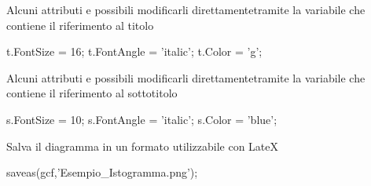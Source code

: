 \begin{par}
\begin{flushleft}
Alcuni attributi e possibili modificarli direttamentetramite la variabile che contiene il 
riferimento al titolo
\end{flushleft}
\end{par}

\begin{matlabcode}
t.FontSize = 16;
t.FontAngle = 'italic';
t.Color = 'g'; %
\end{matlabcode}

\begin{par}
\begin{flushleft}
Alcuni attributi e possibili modificarli direttamentetramite la variabile che contiene il 
riferimento al sottotitolo
\end{flushleft}
\end{par}

\begin{matlabcode}
s.FontSize = 10;
s.FontAngle = 'italic';
s.Color = 'blue'; %
\end{matlabcode}

\begin{par}
\begin{flushleft}
Salva il diagramma in un formato utilizzabile con LateX
\end{flushleft}
\end{par}

\begin{matlabcode}
saveas(gcf,'Esempio_Istogramma.png');
\end{matlabcode}
\begin{center}

\end{center}
